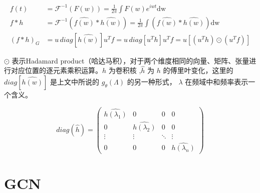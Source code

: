     \begin{myExample}[傅里叶逆变换]
    \begin{align*}
        f(t) & = \mathcal{F}^{-1} \left( F(w) \right) = \frac{1}{2\pi} \int F(w) e^{iwt} \mathrm{dw}  \\
        f * h  & = \mathcal{F}^{-1} \left( \hat{f(w)} * \hat{h(w)}  \right) = \frac{1}{2\pi} \int \left( \hat{f(w)} * \hat{h(w)}  \right)  \mathrm{dw} \\
        ( f * h ) _{G}  & = u \, diag\left [  \hat{h(w)} \right ] u^{T} f  =u \, diag\left [   u^{T} h  \right ] u^{T} f  = u \left[  (u^{T} h) \odot (u^{T} f)  \right]
    \end{align*} 
    
        \begin{myRemark}
            $ \odot $ 表示Hadamard product（哈达马积），对于两个维度相同的向量、矩阵、张量进行对应位置的逐元素乘积运算。$ h $ 为卷积核 ,$\hat{h}$ 为 $h$ 的傅里叶变化，这里的 $diag\left [  \hat{h(w)} \right ] $ 是上文中所说的 $g_{\theta} (\Lambda)$ 的另一种形式， $\lambda$ 在频域中和频率表示一个含义。
        \end{myRemark}
        \[
            diag(\hat{h}) = \begin{pmatrix}
                \hat{h(\lambda _{1})} &  0&  0& 0\\
                0&  \hat{h(\lambda _{2})}&  0&0 \\
                \vdots& \vdots & \ddots & \vdots\\
                0& 0 &  0&\hat{h(\lambda _{n})}
              \end{pmatrix}  \]
    \end{myExample}

    \section{GCN}